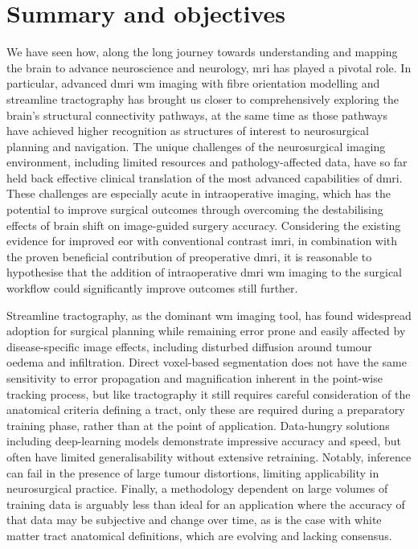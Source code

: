 \section{Summary and objectives}
\label{sec:problem}

We have seen how, along the long journey towards understanding and mapping the brain to advance neuroscience and neurology, \gls{mri} has played a pivotal role.
In particular, advanced \gls{dmri} \gls{wm} imaging with fibre orientation modelling and streamline tractography has brought us closer to comprehensively exploring the brain's structural connectivity pathways, at the same time as those pathways have achieved higher recognition as structures of interest to neurosurgical planning and navigation.
The unique challenges of the neurosurgical imaging environment, including limited resources and pathology-affected data, have so far held back effective clinical translation of the most advanced capabilities of \gls{dmri}.
These challenges are especially acute in intraoperative imaging, which has the potential to improve surgical outcomes through overcoming the destabilising effects of brain shift on image-guided surgery accuracy.
Considering the existing evidence for improved \gls{eor} with conventional contrast \gls{imri}, in combination with the proven beneficial contribution of preoperative \gls{dmri}, it is reasonable to hypothesise that the addition of intraoperative \gls{dmri} \gls{wm} imaging to the surgical workflow could significantly improve outcomes still further\autocite{Manan2022}.

Streamline tractography, as the dominant \gls{wm} imaging tool, has found widespread adoption for surgical planning while remaining error prone and easily affected by disease-specific image effects, including disturbed diffusion around tumour oedema and infiltration.
Direct voxel-based segmentation does not have the same sensitivity to error propagation and magnification inherent in the point-wise tracking process, but like tractography it still requires careful consideration of the anatomical criteria defining a tract, only these are required during a preparatory training phase, rather than at the point of application.
Data-hungry solutions including deep-learning models demonstrate impressive accuracy and speed, but often have limited generalisability without extensive retraining.
Notably, inference can fail in the presence of large tumour distortions, limiting applicability in neurosurgical practice.
Finally, a methodology dependent on large volumes of training data is arguably less than ideal for an application where the accuracy of that data may be subjective and change over time, as is the case with white matter tract anatomical definitions, which are evolving and lacking consensus.

